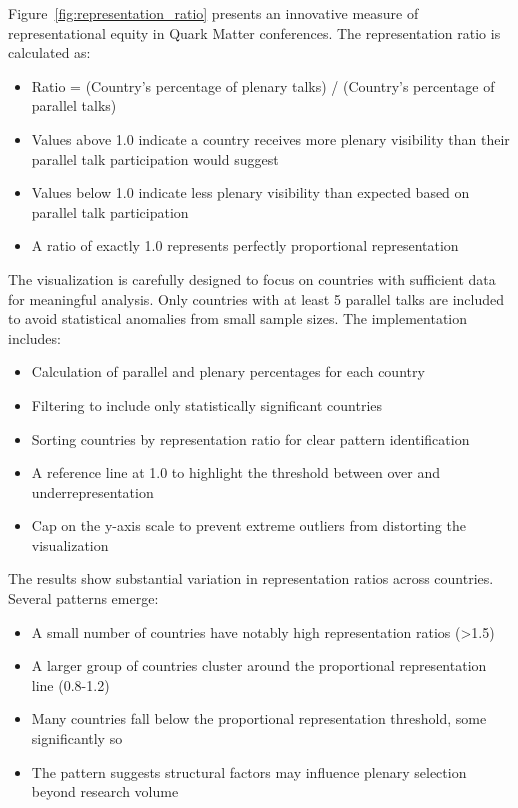 \documentclass[a4paper,11pt]{article}
\begin{document}
Figure~\ref{fig:representation_ratio} presents an innovative measure of representational equity in Quark Matter conferences. The representation ratio is calculated as:

\begin{itemize}
    \item Ratio = (Country's percentage of plenary talks) / (Country's percentage of parallel talks)
    \item Values above 1.0 indicate a country receives more plenary visibility than their parallel talk participation would suggest
    \item Values below 1.0 indicate less plenary visibility than expected based on parallel talk participation
    \item A ratio of exactly 1.0 represents perfectly proportional representation
\end{itemize}

The visualization is carefully designed to focus on countries with sufficient data for meaningful analysis. Only countries with at least 5 parallel talks are included to avoid statistical anomalies from small sample sizes. The implementation includes:

\begin{itemize}
    \item Calculation of parallel and plenary percentages for each country
    \item Filtering to include only statistically significant countries
    \item Sorting countries by representation ratio for clear pattern identification
    \item A reference line at 1.0 to highlight the threshold between over and underrepresentation
    \item Cap on the y-axis scale to prevent extreme outliers from distorting the visualization
\end{itemize}

The results show substantial variation in representation ratios across countries. Several patterns emerge:

\begin{itemize}
    \item A small number of countries have notably high representation ratios (>1.5)
    \item A larger group of countries cluster around the proportional representation line (0.8-1.2)
    \item Many countries fall below the proportional representation threshold, some significantly so
    \item The pattern suggests structural factors may influence plenary selection beyond research volume
\end{itemize}
\end{document}
